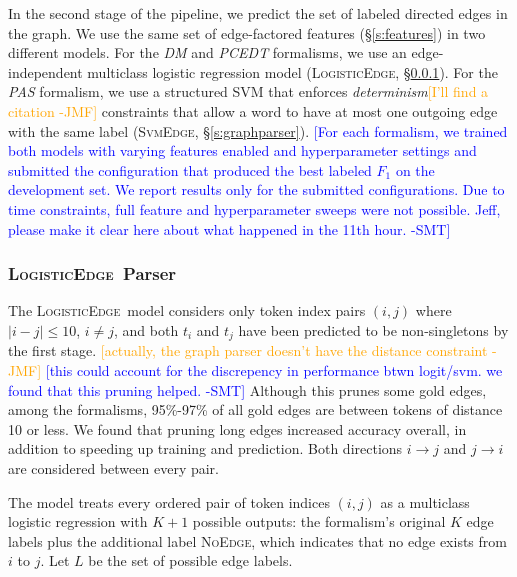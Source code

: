\documentclass[11pt]{article}
\newcommand{\bocomment}[1]{\textcolor{Bittersweet}{[#1 -BTO]}}
\newcommand{\sam}[1]{\textcolor{blue}{[#1 -SMT]}}
\newcommand{\jmf}[1]{\textcolor{orange}{[#1 -JMF]}}
\newcommand{\codenote}[1]{}
\newcommand{\logitedge}{\textsc{LogisticEdge}}
\newcommand{\svmedge}{\textsc{SvmEdge}}
\newcommand{\noedge}{\textsc{NoEdge}}
\begin{document}
In the second stage of the pipeline, we predict the set of labeled directed
edges in the graph.
We use the same set of edge-factored features (\S\ref{s:features}) in two
different models.
For the \emph{DM} and \emph{PCEDT} formalisms, we use an edge-independent multiclass logistic
regression model (\logitedge, \S\ref{s:logitedge}).
For the \emph{PAS} formalism, we use a structured SVM 
\cite{taskar_max_2003,tsochantaridis_support_2004} that enforces 
\emph{determinism}\jmf{I'll find a citation} constraints that allow a word to
have at most one outgoing edge with the
same label (\svmedge, \S\ref{s:graphparser}).
\sam{For each formalism, we trained both models with varying features enabled
and hyperparameter settings and submitted the configuration that produced the
best labeled $F_1$ on the development set.
We report results only for the submitted configurations.
Due to time constraints, full feature and hyperparameter sweeps were not
possible.
Jeff, please make it clear here about what happened in the 11th
hour.}


\subsubsection{\logitedge\ Parser}
\label{s:logitedge}


\codenote{LRParser.java}

The \logitedge\ model considers only token index pairs $(i, j)$ where %
$|i-j| \leq 10$, $i \ne j$, and both $t_i$ and
$t_j$ have been predicted to be non-singletons by the first stage.
\jmf{actually, the graph parser doesn't have the distance constraint}
\sam{this could account for the discrepency in performance btwn logit/svm. we
found that this pruning helped.}
Although this prunes some gold edges, among the formalisms,
95\%-97\% of all gold edges are between tokens of distance 10 or less.
We found that pruning long edges increased accuracy overall, in addition to
speeding up training and prediction.
Both directions $i \rightarrow j$ and $j \rightarrow
i$ are considered between every pair.

The model treats every ordered pair of token indices $(i, j)$ as a
multiclass logistic regression with $K+1$ possible outputs:
the formalism's original $K$ edge labels plus the additional label \noedge,
which indicates that no edge exists from $i$ to $j$.
Let $L$ be the set of possible edge labels.
\end{document}
